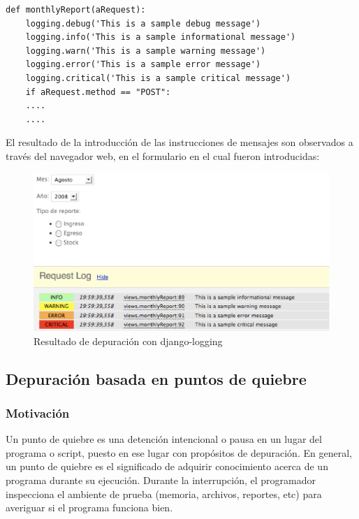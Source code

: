 \documentclass[12pt,legalpaper]{report}
\begin{document}
\begin{singlespace}
\begin{lstlisting}[style=Python]
def monthlyReport(aRequest):
    logging.debug('This is a sample debug message')
    logging.info('This is a sample informational message')
    logging.warn('This is a sample warning message')
    logging.error('This is a sample error message')
    logging.critical('This is a sample critical message')    
    if aRequest.method == "POST":
    ....
    ....
\end{lstlisting}
\end{singlespace}

El resultado de la introducción de las instrucciones de mensajes son observados a través del navegador web, en el formulario en el cual fueron introducidas:

\begin{figure}[hpb]
	\centering
	\includegraphics[scale=0.5]{images/django-logging.eps}
	\caption{Resultado de depuración con django-logging}
\end{figure}
 


		\subsection{Depuración basada en puntos de quiebre}
			\subsubsection{Motivación}

Un punto de quiebre es una detención intencional o pausa en un lugar del programa o script, puesto en ese lugar con propósitos de depuración.  En general, un punto de quiebre es el significado de adquirir conocimiento acerca de un programa durante su ejecución.  Durante la interrupción, el programador inspecciona el ambiente de prueba (memoria, archivos, reportes, etc) para averiguar si el programa funciona bien.
\end{document}

